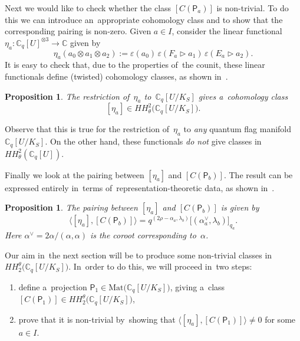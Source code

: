 \documentclass[10pt,a4paper]{amsart}
\numberwithin{equation}{section}
\newtheorem{Proposition}[Theorem]{Proposition}
 { \theoremstyle{definition}
\newtheorem{Definition}[Theorem]{Definition}
\newtheorem{Note}[Theorem]{Note}
\newtheorem{Example}[Theorem]{Example}
\newtheorem{Remark}[Theorem]{Remark} }
\newcommand{\CqU}{\mathbb{C}_q[U]}
\newcommand{\Cqflag}{\mathbb{C}_q[U / K_S]}
\newcommand{\bbC}{\mathbb{C}}
\newcommand{\proj}{\mathsf{P}}
\begin{document}
Next we would like to check whether the class $[C(\proj_a)]$ is non-trivial.
To do this we can int\-ro\-duce an~appropriate cohomology class and to show that the corresponding pairing is non-zero.
Given $a \in I$, consider the linear functional $\eta_a\colon \CqU^{\otimes 3} \to \bbC$ given by
\[
\eta_a(a_0 \otimes a_1 \otimes a_2) := \varepsilon(a_0)\, \varepsilon(F_a \triangleright a_1) \, \varepsilon(E_a \triangleright a_2).
\]
It is easy to check that, due to the properties of~the counit, these linear functionals define (twisted) cohomology classes, as shown in~\cite[Proposition~5.5]{twist-hoch}.

\begin{Proposition}
The restriction of~$\eta_a$ to~$\Cqflag$ gives a~cohomology class
\[
[\eta_a] \in HH^2_\theta\big(\Cqflag\big).
\]
\end{Proposition}

\begin{Remark}
Observe that this is true for the restriction of~$\eta_a$ to \emph{any} quantum flag manifold $\Cqflag$.
On the other hand, these functionals \emph{do not} give classes in~$HH^2_\theta(\CqU)$.
\end{Remark}

Finally we look at the pairing between $[\eta_a]$ and $[C(\proj_b)]$.
The result can be expressed entirely in~terms of~representation-theoretic data, as shown in~\cite[Proposition~6.11]{twist-hoch}.

\begin{Proposition}
\label{prop:pairing-classes}
The pairing between $[\eta_a]$ and $[C(\proj_b)]$ is given by
\[
\big\langle [\eta_a], [C(\proj_b)] \big\rangle = q^{(2 \rho - \alpha_a, \lambda_b)}
\big[(\alpha_a^\vee, \lambda_b)\big]_{q_a}.
\]
Here $\alpha^\vee = 2 \alpha / (\alpha, \alpha)$ is the coroot corresponding to~$\alpha$.
\end{Proposition}

Our aim in~the next section will be to produce some non-trivial classes in~$HH^\theta_2\big(\Cqflag\big)$.
In~order to do this, we will proceed in~two steps:
\begin{enumerate}\itemsep=0pt
\item[1)] define a~projection $\proj_1 \in \mathrm{Mat}\big(\Cqflag\big)$, giving a~class $[C(\proj_1)] \in HH^\theta_2\big(\Cqflag\big)$,
\item[2)] prove that it is non-trivial by~showing that $\langle [\eta_a], [C(\proj_1)]\rangle \neq 0$ for some $a \in I$.
\end{enumerate}
\end{document}
